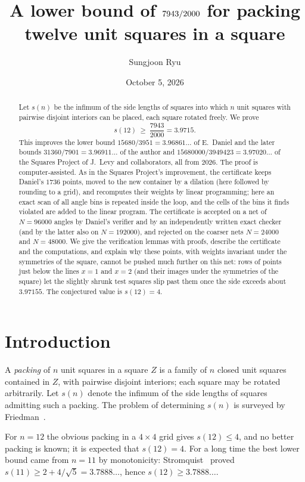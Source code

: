 \documentclass[11pt]{amsart}
\title[$s(12)\ge \sfrac$]{A lower bound of $7943/2000$ for packing twelve unit squares in a square}
\author{Sungjoon Ryu}
\date{October 5, 2026}
\theoremstyle{definition}
\theoremstyle{remark}
\newcommand{\sdfrac}{\frac{7943}{2000}}
\newcommand{\sdec}{3.9715}
\begin{document}
\begin{abstract}
Let $s(n)$ be the infimum of the side lengths of squares into which $n$ unit squares with pairwise disjoint interiors can be placed, each square rotated freely. We prove
\[
  s(12)\ \ge\ \sdfrac = \sdec .
\]
This improves the lower bound $15680/3951=3.96861\ldots$ of E.~Daniel and the later bounds $31360/7901=3.96911\ldots$ of the author and $15680000/3949423=3.97020\ldots$ of the Squares Project of J.~Levy and collaborators, all from 2026. The proof is computer-assisted. As in the Squares Project's improvement, the certificate keeps Daniel's $1736$ points, moved to the new container by a dilation (here followed by rounding to a grid), and recomputes their weights by linear programming; here an exact scan of all angle bins is repeated inside the loop, and the cells of the bins it finds violated are added to the linear program. The certificate is accepted on a net of $N=96000$ angles by Daniel's verifier and by an independently written exact checker (and by the latter also on $N=192000$), and rejected on the coarser nets $N=24000$ and $N=48000$. We give the verification lemmas with proofs, describe the certificate and the computations, and explain why these points, with weights invariant under the symmetries of the square, cannot be pushed much further on this net: rows of points just below the lines $x=1$ and $x=2$ (and their images under the symmetries of the square) let the slightly shrunk test squares slip past them once the side exceeds about $3.97155$. The conjectured value is $s(12)=4$.
\end{abstract}

\maketitle

\section{Introduction}

A \emph{packing} of $n$ unit squares in a square $Z$ is a family of $n$ closed unit squares contained in $Z$, with pairwise disjoint interiors; each square may be rotated arbitrarily. Let $s(n)$ denote the infimum of the side lengths of squares admitting such a packing. The problem of determining $s(n)$ is surveyed by Friedman~\cite{Fri09}.

For $n=12$ the obvious packing in a $4\times4$ grid gives $s(12)\le 4$, and no better packing is known; it is expected that $s(12)=4$. For a long time the best lower bound came from $n=11$ by monotonicity: Stromquist~\cite{Str03} proved $s(11)\ge 2+4/\sqrt5 = 3.7888\ldots$, hence $s(12)\ge 3.7888\ldots$.
\end{document}
